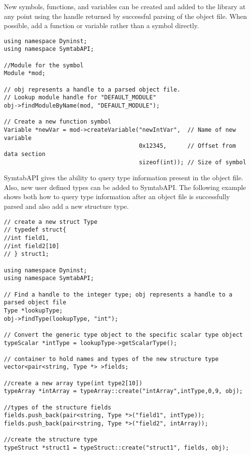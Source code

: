 \newpage

New symbols, functions, and variables can be created and added to the library at any point using the handle returned by successful parsing of the object file. When possible, add a function or variable rather than a symbol directly. 

\begin{lstlisting}
using namespace Dyninst;
using namespace SymtabAPI;

//Module for the symbol
Module *mod;

// obj represents a handle to a parsed object file.
// Lookup module handle for "DEFAULT_MODULE"
obj->findModuleByName(mod, "DEFAULT_MODULE");

// Create a new function symbol
Variable *newVar = mod->createVariable("newIntVar",  // Name of new variable
                                       0x12345,      // Offset from data section
                                       sizeof(int)); // Size of symbol 
\end{lstlisting}

SymtabAPI gives the ability to query type information present in the object file. Also, new user defined types can be added to SymtabAPI. The following example shows both how to query type information after an object file is successfully parsed and also add a new structure type.

\begin{lstlisting}
// create a new struct Type
// typedef struct{
//int field1,
//int field2[10]
// } struct1;

using namespace Dyninst;
using namespace SymtabAPI;

// Find a handle to the integer type; obj represents a handle to a parsed object file
Type *lookupType;
obj->findType(lookupType, "int");

// Convert the generic type object to the specific scalar type object
typeScalar *intType = lookupType->getScalarType();

// container to hold names and types of the new structure type
vector<pair<string, Type *> >fields;

//create a new array type(int type2[10])
typeArray *intArray = typeArray::create("intArray",intType,0,9, obj);

//types of the structure fields
fields.push_back(pair<string, Type *>("field1", intType));
fields.push_back(pair<string, Type *>("field2", intArray));

//create the structure type
typeStruct *struct1 = typeStruct::create("struct1", fields, obj);
\end{lstlisting}

